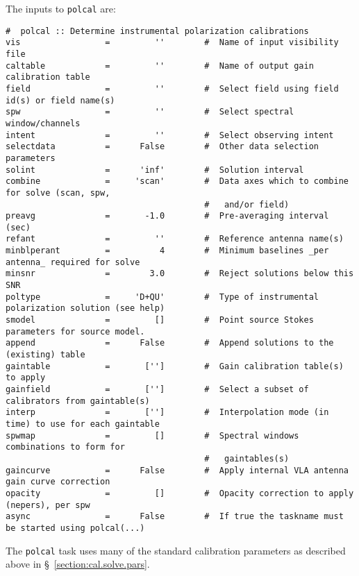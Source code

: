 The inputs to {\tt polcal} are:
\small
\begin{verbatim}
#  polcal :: Determine instrumental polarization calibrations
vis                 =         ''        #  Name of input visibility file
caltable            =         ''        #  Name of output gain calibration table
field               =         ''        #  Select field using field id(s) or field name(s)
spw                 =         ''        #  Select spectral window/channels
intent              =         ''        #  Select observing intent
selectdata          =      False        #  Other data selection parameters
solint              =      'inf'        #  Solution interval
combine             =     'scan'        #  Data axes which to combine for solve (scan, spw,
                                        #   and/or field)
preavg              =       -1.0        #  Pre-averaging interval (sec)
refant              =         ''        #  Reference antenna name(s)
minblperant         =          4        #  Minimum baselines _per antenna_ required for solve
minsnr              =        3.0        #  Reject solutions below this SNR
poltype             =     'D+QU'        #  Type of instrumental polarization solution (see help)
smodel              =         []        #  Point source Stokes parameters for source model.
append              =      False        #  Append solutions to the (existing) table
gaintable           =       ['']        #  Gain calibration table(s) to apply
gainfield           =       ['']        #  Select a subset of calibrators from gaintable(s)
interp              =       ['']        #  Interpolation mode (in time) to use for each gaintable
spwmap              =         []        #  Spectral windows combinations to form for
                                        #   gaintables(s)
gaincurve           =      False        #  Apply internal VLA antenna gain curve correction
opacity             =         []        #  Opacity correction to apply (nepers), per spw
async               =      False        #  If true the taskname must be started using polcal(...)
\end{verbatim}
\normalsize
The {\tt polcal} task uses many of the standard calibration parameters
as described above in \S~\ref{section:cal.solve.pars}.

